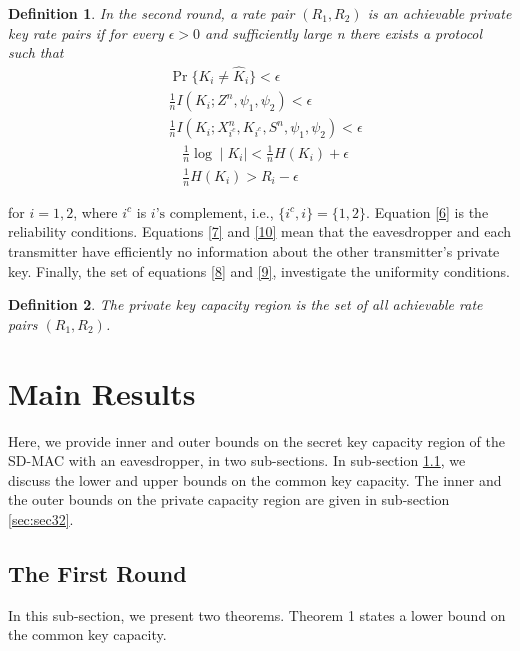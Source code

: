\documentclass[conference,8pt]{IEEEtran}
\newtheorem{th2}{Definition}
\begin{document}
{{{\begin{th2}
In the second round, a rate pair $(R_1,R_2)$ is an achievable private key rate pairs if for every $ \epsilon >0$ and sufficiently large n there exists a protocol such that
\begin{align}
&\Pr \{ K_{i} \neq \hat{K}_{i} \} < \epsilon  \label{6} \\
&\frac{1}{n} I(K_i;Z^n,\psi_{1},\psi_{2}) < \epsilon \label{7} \\
&\frac{1}{n} I(K_i;X^n_{i^c},K_{i^c},S^n,\psi_{1},\psi_{2}) < \epsilon  \label{10}
\end{align}
\begin{align}
&\frac{1}{n} \log \mid K_i \mid < \frac{1}{n} H(K_i) + \epsilon  \label{8} \\
&\frac{1}{n} H(K_i) > R_i - \epsilon \label{9}
\end{align}
\end{th2}for $i=1,2$, where $i^c$ is $i \text{'s}$ complement, i.e., $\{ i^c , i \} = \{1,2 \}$. Equation \eqref{6} is the reliability conditions. Equations \eqref{7} and \eqref{10} mean that the eavesdropper and each transmitter have efficiently no information about the other transmitter's private key. Finally, the set of equations \eqref{8} and \eqref{9}, investigate the uniformity conditions. 

\begin{th2}
The private key capacity region is the set of all achievable rate pairs $(R_1,R_2)$.
\end{th2}
}
}
\section{Main Results}{
Here, we provide inner and outer bounds on the secret key capacity region of the SD-MAC with an eavesdropper, in two sub-sections. In sub-section \ref{sec:sec31}, we discuss the lower and upper bounds on the common key capacity. The inner and the outer bounds on the private capacity region are given in sub-section \ref{sec:sec32}. 

\subsection{The First Round}\label{sec:sec31}{
In this sub-section, we present two theorems. Theorem 1 states a lower bound on the common key capacity.

}}}
\end{document}
